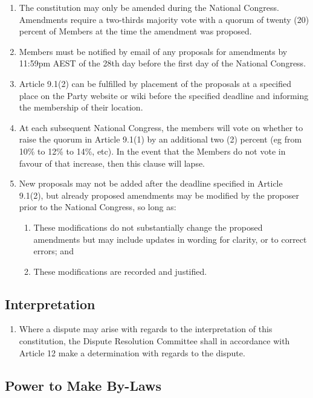 \documentclass[a4paper,titlepage,8.5pt]{article}
\begin{document}
\begin{enumerate}
\item The constitution may only be amended during the National Congress. Amendments require a two-thirds majority vote with a quorum of twenty (20) percent of Members at the time the amendment was proposed.
\item Members must be notified by email of any proposals for amendments by 11:59pm AEST of the 28th day before the first day of the National Congress.
\item Article 9.1(2) can be fulfilled by placement of the proposals at a specified place on the Party website or wiki before the specified deadline and informing the membership of their location.
\item At each subsequent National Congress, the members will vote on whether to raise the quorum in Article 9.1(1) by an additional two (2) percent (eg from 10\% to 12\% to 14\%, etc). In the event that the Members do not vote in favour of that increase, then this clause will lapse.
\item New proposals may not be added after the deadline specified in Article 9.1(2), but already proposed amendments may be modified by the proposer prior to the National Congress, so long as:
\begin{enumerate}
  \item These modifications do not substantially change the proposed amendments but may include updates in wording for clarity, or to correct errors; and
  \item These modifications are recorded and justified.
\end{enumerate}

\end{enumerate}

\subsection{Interpretation}

\begin{enumerate}
\item Where a dispute may arise with regards to the interpretation of this constitution, the Dispute Resolution Committee shall in accordance with Article 12 make a determination with regards to the dispute.
\end{enumerate}

\subsection{Power to Make By-Laws}
\end{document}
